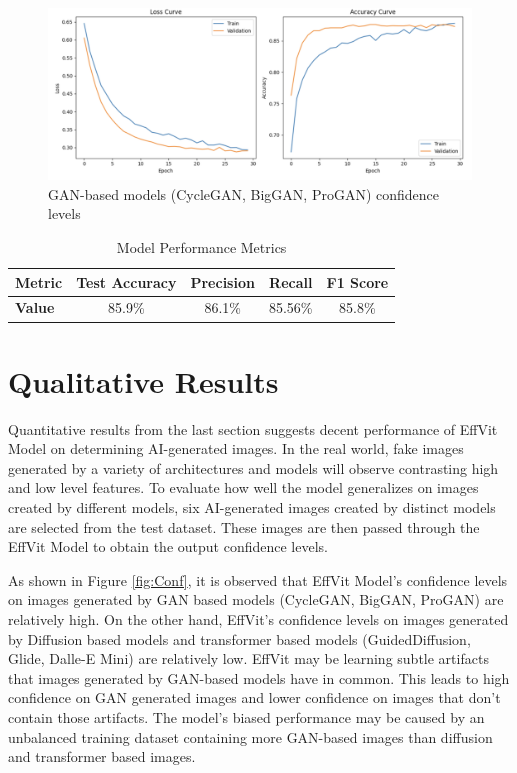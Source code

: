 \documentclass{article} %
\begin{document}
\begin{figure}[h]
    \begin{center}
        \includegraphics[scale=0.27]{figs/training curves.png}
    \end{center}
    \caption{GAN-based models (CycleGAN, BigGAN, ProGAN) confidence levels}
    \label{fig:Training_Curves}
\end{figure}

\begin{table}[h]
    \centering
    \caption{Model Performance Metrics}
    \label{tab:metrics}
    \begin{tabular}{lcccc}
    \toprule
    \textbf{Metric} & \textbf{Test Accuracy} & \textbf{Precision} & \textbf{Recall} & \textbf{F1 Score} \\
    \midrule
    \textbf{Value}  & 85.9\%                & 86.1\%             & 85.56\%          & 85.8\%           \\
    \bottomrule
    \end{tabular}
    \end{table}
    


\section{Qualitative Results}
Quantitative results from the last section suggests decent performance of EffVit Model on determining AI-generated images. In the real world, fake images generated by a variety of architectures and models will observe contrasting high and low level features. To evaluate how well the model generalizes on images created by different models, six AI-generated images created by distinct models are selected from the test dataset. These images are then passed through the EffVit Model to obtain the output confidence levels.

As shown in Figure \ref{fig:Conf}, it is observed that EffVit Model's confidence levels on images generated by GAN based models (CycleGAN, BigGAN, ProGAN) are relatively high. On the other hand, EffVit's confidence levels on images generated by Diffusion based models and transformer based models (GuidedDiffusion, Glide, Dalle-E Mini) are relatively low. EffVit may be learning subtle artifacts that images generated by GAN-based models have in common. This leads to high confidence on GAN generated images and lower confidence on images that don't contain those artifacts. The model's biased performance may be caused by an unbalanced training dataset containing more GAN-based images than diffusion and transformer based images.
\end{document}
